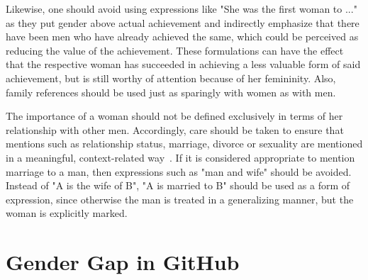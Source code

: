 \documentclass[a4paper, 11pt]{article}
\begin{document}
Likewise, one should avoid using expressions like "She was the first woman to ..." as they put gender above actual achievement and indirectly emphasize that there have been men who have already achieved the same, which could be perceived as reducing the value of the achievement. These formulations can have the effect that the respective woman has succeeded in achieving a less valuable form of said achievement, but is still worthy of attention because of her femininity. Also, family references should be used just as sparingly with women as with men.

The importance of a woman should not be defined exclusively in terms of her relationship with other men. Accordingly, care should be taken to ensure that mentions such as relationship status, marriage, divorce or sexuality are mentioned in a meaningful, context-related way~\cite{graells2015first}. If it is considered appropriate to mention marriage to a man, then expressions such as "man and wife" should be avoided. Instead of "A is the wife of B", "A is married to B" should be used as a form of expression, since otherwise the man is treated in a generalizing manner, but the woman is explicitly marked.

\section{Gender Gap in GitHub} \label{sec:gender-gap-github}




\doclicenseThis
\end{document}
